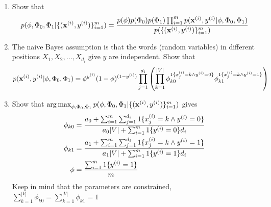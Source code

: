 \begin{enumerate}[label=\alph*)]
\item Show that
\begin{align*}
    p(\phi, \Phi_0, \Phi_1 | \{(\mathbf{x}^{(i)}, y^{(i)})\}_{i = 1}^{m}) = \frac{p(\phi)p(\Phi_0) p(\Phi_1)   \prod_{i = 1}^{m} p(\mathbf{x}^{(i)}, y^{(i)} | \phi, \Phi_0, \Phi_1)}{p(\{(\mathbf{x}^{(i)}, y^{(i)})\}_{i = 1}^{m})}
\end{align*}
\item The naive Bayes assumption is that the words (random variables) in different positions $X_1, X_2,\dots, X_{d_i}$ give $y$ are independent. Show that
\begin{equation*}
p(\mathbf{x}^{(i)}, y^{(i)} | \phi, \Phi_0, \Phi_1) =  \phi^{y^{(i)}}(1 - \phi)^{(1 - y^{(i)})} \prod_{j = 1}^{d_i} \left(\prod_{k = 1}^{|V|}\phi_{k0}^{1\{x^{(i)}_j = k \land y^{(i)} = 0\}} \phi_{k1}^{1\{x^{(i)}_j = k \land y^{(i)} = 1\}}\right)
\end{equation*}

\item Show that $\operatorname*{arg\,max}_{\phi, \Phi_0, \Phi_1} p(\phi, \Phi_0, \Phi_1 | \{(\mathbf{x}^{(i)}, y^{(i)})\}_{i = 1}^{m})$ gives
\begin{align*}
\phi_{k0} &= \frac{a_0 + \sum_{i=1}^{m} \sum_{j=1}^{d_i} 1\{x_j^{(i)} = k \land y^{(i)} = 0\}}{a_0 |V| + \sum_{i=1}^{m} 1\{y^{(i)} = 0\}d_i}\\
\phi_{k1} &= \frac{a_1 + \sum_{i=1}^{m} \sum_{j=1}^{d_i} 1\{x_j^{(i)} = k \land y^{(i)} = 1\}}{a_1 |V| + \sum_{i=1}^{m} 1\{y^{(i)} = 1\}d_i}\\
\phi &= \frac{\sum_{i=1}^{m} 1\{y^{(i)} = 1\}}{m}
\end{align*}
Keep in mind that the parameters are constrained, $\sum_{k = 1}^{|V|} \phi_{k0} = \sum_{k = 1}^{|V|} \phi_{k1} = 1$
\end{enumerate}